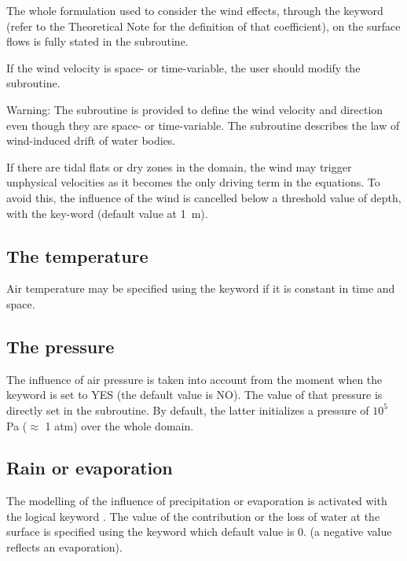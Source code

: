 The whole formulation used to consider the wind effects, through the keyword
 (refer to the Theoretical Note for the
definition of that coefficient), on the surface flows is fully stated in the
 subroutine.

If the wind velocity is space- or time-variable, the user should modify the
 subroutine.

\begin{WarningBlock}{Warning:}
The  subroutine is provided to define the wind velocity and
direction even though they are space- or time-variable.
The  subroutine describes the law of wind-induced drift
of water bodies.
\end{WarningBlock}

If there are tidal flats or dry zones in the domain, the wind may trigger
unphysical velocities as it becomes the only driving term in the equations. To
avoid this, the influence of the wind is cancelled below a threshold value of
depth, with the key-word  (default value at
1~m).


\subsection{The temperature}

Air temperature may be specified using the keyword  if
it is constant in time and space.


\subsection{The pressure}

The influence of air pressure is taken into account from the moment when the
keyword  is set to YES (the default value is
NO). The value of that pressure is directly set in the  subroutine.
By default, the latter initializes a pressure of $10^5$ Pa ($\approx$ 1 atm) over
the whole domain.


\subsection{Rain or evaporation}

The modelling of the influence of precipitation or evaporation is activated
with the logical keyword . The value of the
contribution or the loss of water at the surface is specified using the keyword
 which default value is 0. (a
negative value reflects an evaporation).

